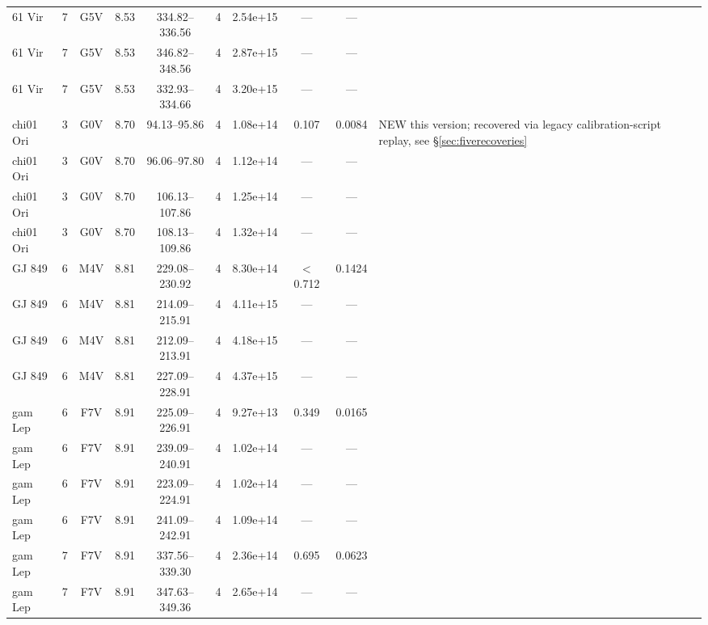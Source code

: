 \documentclass{openjournal}
\begin{document}
\begin{table}
\begin{tabularx}{\textwidth}{@{}l c c c c c c c c X@{}}
61 Vir & 7 & G5V & 8.53 & 334.82--336.56 & 4 & 2.54e+15 & --- & --- &  \\
61 Vir & 7 & G5V & 8.53 & 346.82--348.56 & 4 & 2.87e+15 & --- & --- &  \\
61 Vir & 7 & G5V & 8.53 & 332.93--334.66 & 4 & 3.20e+15 & --- & --- &  \\
chi01 Ori & 3 & G0V & 8.70 & 94.13--95.86 & 4 & 1.08e+14 & 0.107 & 0.0084 & NEW this version; recovered via legacy calibration-script replay, see \S\ref{sec:fiverecoveries} \\
chi01 Ori & 3 & G0V & 8.70 & 96.06--97.80 & 4 & 1.12e+14 & --- & --- &  \\
chi01 Ori & 3 & G0V & 8.70 & 106.13--107.86 & 4 & 1.25e+14 & --- & --- &  \\
chi01 Ori & 3 & G0V & 8.70 & 108.13--109.86 & 4 & 1.32e+14 & --- & --- &  \\
GJ 849 & 6 & M4V & 8.81 & 229.08--230.92 & 4 & 8.30e+14 & $<$0.712 & 0.1424 &  \\
GJ 849 & 6 & M4V & 8.81 & 214.09--215.91 & 4 & 4.11e+15 & --- & --- &  \\
GJ 849 & 6 & M4V & 8.81 & 212.09--213.91 & 4 & 4.18e+15 & --- & --- &  \\
GJ 849 & 6 & M4V & 8.81 & 227.09--228.91 & 4 & 4.37e+15 & --- & --- &  \\
gam Lep & 6 & F7V & 8.91 & 225.09--226.91 & 4 & 9.27e+13 & 0.349 & 0.0165 &  \\
gam Lep & 6 & F7V & 8.91 & 239.09--240.91 & 4 & 1.02e+14 & --- & --- &  \\
gam Lep & 6 & F7V & 8.91 & 223.09--224.91 & 4 & 1.02e+14 & --- & --- &  \\
gam Lep & 6 & F7V & 8.91 & 241.09--242.91 & 4 & 1.09e+14 & --- & --- &  \\
gam Lep & 7 & F7V & 8.91 & 337.56--339.30 & 4 & 2.36e+14 & 0.695 & 0.0623 &  \\
gam Lep & 7 & F7V & 8.91 & 347.63--349.36 & 4 & 2.65e+14 & --- & --- &  \\
\hline
\end{tabularx}
\end{table}
\end{document}
